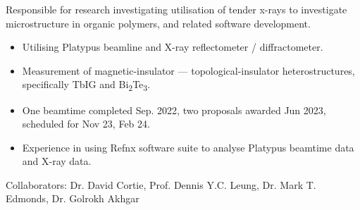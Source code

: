 \documentclass[10pt,a4paper,ragged2e,withhyper]{altacv}
\begin{document}
		Responsible for research investigating utilisation of tender x-rays to investigate microstructure in organic polymers, and related software development.
		
		\divider
	
			\begin{itemize}
				\item Utilising Platypus beamline and X-ray reflectometer / diffractometer.
				\item Measurement of magnetic-insulator --- topological-insulator heterostructures, specifically TbIG and Bi\textsubscript{2}Te\textsubscript{3}.
				\item One beamtime completed Sep. 2022, two proposals awarded Jun 2023, scheduled for Nov 23, Feb 24.
				\item Experience in using Refnx software suite to analyse Platypus beamtime data and X-ray data.
			\end{itemize}
			\faUsers\hspace{4pt} Collaborators: Dr. David Cortie, Prof. Dennis Y.C. Leung, Dr. Mark T. Edmonds, Dr. Golrokh Akhgar
			
			\divider
			
\end{document}
